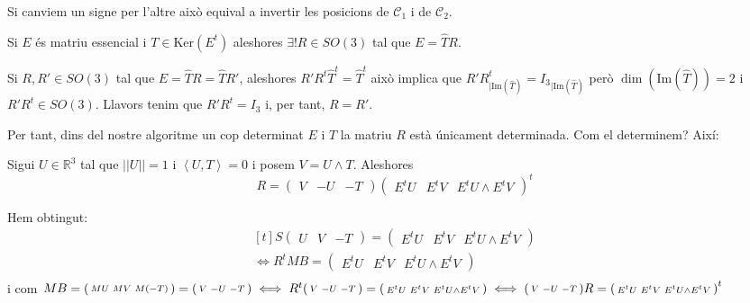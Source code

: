 \documentclass[a4paper,12pt]{article}
\begin{document}
\begin{enumerate}
		\begin{obs}
			Si canviem un signe per l'altre això equival a invertir les posicions de $\mathcal{C}_1$ i de $\mathcal{C}_2$.
		\end{obs}
		\begin{proposicio}
			Si $E$ és matriu essencial i $T \in \text{Ker}(E^t)$ aleshores $\exists!R\in SO(3)$ tal que $E = \hat{T}R$.
		\end{proposicio}
		\begin{demostracio}
			Si $R, R' \in SO(3)$ tal que $E = \hat{T}R = \hat{T}R'$, aleshores $R'R^t\hat{T}^t = \hat{T}^t$ això implica que $R'R^t_{|\text{Im}(\hat{T})} = {I_3}_{|\text{Im}(\hat{T})}$ però $\dim(\text{Im}(\hat{T})) = 2$ i $R'R^t \in SO(3)$. Llavors tenim que $R'R^t = I_3$ i, per tant, $R = R'$.
		\end{demostracio}
		Per tant, dins del nostre algoritme un cop determinat $E$ i $T$ la matriu $R$ està únicament determinada. Com el determinem? Així:
		\begin{proposicio}
			Sigui $U \in \mathbb{R}^3$ tal que $||U|| = 1$ i $\left\langle U, T \right\rangle = 0$ i posem $V = U \wedge T$. Aleshores
			\begin{displaymath}
				R = \begin{pmatrix}V&-U&-T\end{pmatrix}\begin{pmatrix}E^tU&E^tV&E^tU\wedge E^tV\end{pmatrix}^t
			\end{displaymath}
		\end{proposicio}
		\begin{demostracio}
			Hem obtingut:
			\begin{displaymath}
				\begin{aligned}[t]
					S \begin{pmatrix} U & V & -T \end{pmatrix} = \begin{pmatrix} E^tU & E^tV & E^tU \wedge E^tV \end{pmatrix}\\
					\iff R^tMB = \begin{pmatrix} E^tU & E^tV & E^tU \wedge E^tV \end{pmatrix}\\
				\end{aligned}
			\end{displaymath}
			i com $MB = \begin{psmallmatrix}MU & MV & M(-T)\end{psmallmatrix} = \begin{psmallmatrix}V & -U & -T\end{psmallmatrix} \iff R^t\begin{psmallmatrix}V & -U & -T\end{psmallmatrix} = \begin{psmallmatrix}E^tU & E^tV & E^tU \wedge E^tV\end{psmallmatrix} \iff \begin{psmallmatrix}V & -U & -T\end{psmallmatrix}R = \begin{psmallmatrix}E^tU & E^tV & E^tU \wedge E^tV\end{psmallmatrix}^t$

\end{demostracio}
\end{enumerate}
\end{document}
